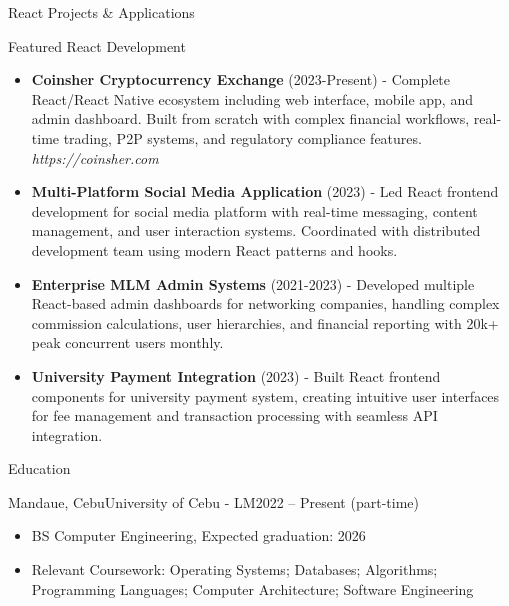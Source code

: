 \documentclass[]{mcdowellcv}
\begin{document}
	\begin{cvsection}{React Projects \& Applications}
		\begin{cvsubsection}{Featured React Development}{}{}
			\begin{itemize}
				\item \textbf{Coinsher Cryptocurrency Exchange} (2023-Present) - Complete React/React Native ecosystem including web interface, mobile app, and admin dashboard. Built from scratch with complex financial workflows, real-time trading, P2P systems, and regulatory compliance features. \newline \textit{https://coinsher.com}
				\item \textbf{Multi-Platform Social Media Application} (2023) - Led React frontend development for social media platform with real-time messaging, content management, and user interaction systems. Coordinated with distributed development team using modern React patterns and hooks.
				\item \textbf{Enterprise MLM Admin Systems} (2021-2023) - Developed multiple React-based admin dashboards for networking companies, handling complex commission calculations, user hierarchies, and financial reporting with 20k+ peak concurrent users monthly.
				\item \textbf{University Payment Integration} (2023) - Built React frontend components for university payment system, creating intuitive user interfaces for fee management and transaction processing with seamless API integration.
			\end{itemize}
		\end{cvsubsection}
	\end{cvsection}
	
	\begin{cvsection}{Education}
		\begin{cvsubsection}{Mandaue, Cebu}{University of Cebu - LM}{2022 -- Present (part-time)}
			\begin{itemize}
				\item BS Computer Engineering, Expected graduation: 2026
				\item Relevant Coursework: Operating Systems; Databases; Algorithms; Programming Languages; Computer Architecture; Software Engineering
			\end{itemize}
		\end{cvsubsection}
	\end{cvsection}
	
\end{document}
